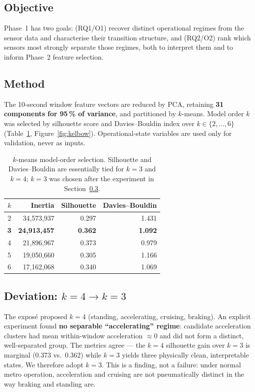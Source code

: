 \documentclass[11pt,a4paper]{article}
\begin{document}
\subsection{Objective}
Phase~1 has two goals: (RQ1/O1) recover distinct operational regimes from the sensor
data and characterise their transition structure, and (RQ2/O2) rank which sensors most
strongly separate those regimes, both to interpret them and to inform Phase~2 feature
selection.

\subsection{Method}
The 10-second window feature vectors are reduced by PCA, retaining \textbf{31 components
for 95\,\% of variance}, and partitioned by $k$-means. Model order $k$ was selected by
silhouette score and Davies--Bouldin index over $k\in\{2,\dots,6\}$
(Table~\ref{tab:kselect}, Figure~\ref{fig:kelbow}). Operational-state variables are used
only for validation, never as inputs.

\begin{table}[H]
\centering
\caption{$k$-means model-order selection. Silhouette and Davies--Bouldin are essentially
tied for $k=3$ and $k=4$; $k=3$ was chosen after the experiment in
Section~\ref{sec:k3}.}
\label{tab:kselect}
\small
\begin{tabular}{c r r r}
\toprule
$k$ & Inertia & Silhouette & Davies--Bouldin\\
\midrule
2 & 34{,}573{,}937 & 0.297 & 1.431\\
\textbf{3} & \textbf{24{,}913{,}457} & \textbf{0.362} & \textbf{1.092}\\
4 & 21{,}896{,}967 & 0.373 & 0.979\\
5 & 19{,}050{,}660 & 0.305 & 1.166\\
6 & 17{,}162{,}068 & 0.340 & 1.069\\
\bottomrule
\end{tabular}
\end{table}

\subsection{Deviation: $k=4 \rightarrow k=3$}
\label{sec:k3}
The exposé proposed $k=4$ (standing, accelerating, cruising, braking). An explicit
experiment found \textbf{no separable ``accelerating'' regime}: candidate acceleration
clusters had mean within-window acceleration $\approx 0$ and did not form a distinct,
well-separated group. The metrics agree --- the $k=4$ silhouette gain over $k=3$ is
marginal (0.373 vs.\ 0.362) while $k=3$ yields three physically clean, interpretable
states. We therefore adopt \textbf{$k=3$}. This is a finding, not a failure: under normal
metro operation, acceleration and cruising are not pneumatically distinct in the way
braking and standing are.
\end{document}
